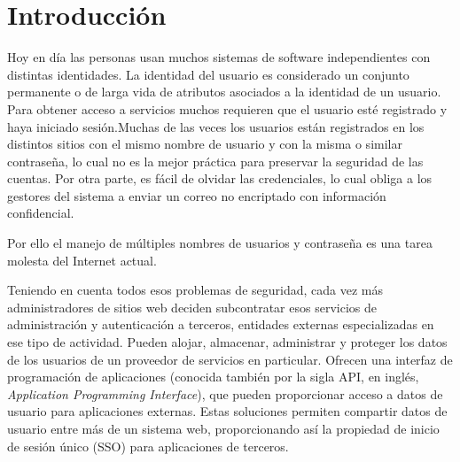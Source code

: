 \chapter*{Introducción}\label{chapter:introduction}

Hoy en día las personas usan muchos sistemas de software independientes con distintas identidades. La identidad del usuario es considerado un conjunto permanente o de larga vida de atributos asociados a la identidad de un usuario. Para obtener acceso a servicios muchos requieren que el usuario esté registrado y haya iniciado sesión.Muchas de las veces los usuarios están registrados en los distintos sitios con el mismo nombre de usuario y con la misma o similar contraseña, lo cual no es la mejor práctica para preservar la seguridad de las cuentas. Por otra parte, es fácil de olvidar las credenciales, lo cual obliga a los gestores del sistema a enviar un correo no encriptado con información confidencial.

Por ello el manejo de múltiples nombres de usuarios y contraseña es una tarea molesta del Internet actual.

Teniendo en cuenta todos esos problemas de seguridad, cada vez más administradores de sitios web deciden subcontratar esos servicios de administración y autenticación a terceros, entidades externas especializadas en ese tipo de actividad. Pueden alojar, almacenar, administrar y proteger los datos de los usuarios de un proveedor de servicios en particular. Ofrecen una interfaz de programación de aplicaciones (conocida también por la sigla API, en inglés, \textit{Application Programming Interface}), que pueden proporcionar acceso a datos de usuario para aplicaciones externas. Estas soluciones permiten compartir datos de usuario entre más de un sistema web, proporcionando así la propiedad de inicio de sesión único (SSO) para aplicaciones de terceros.

